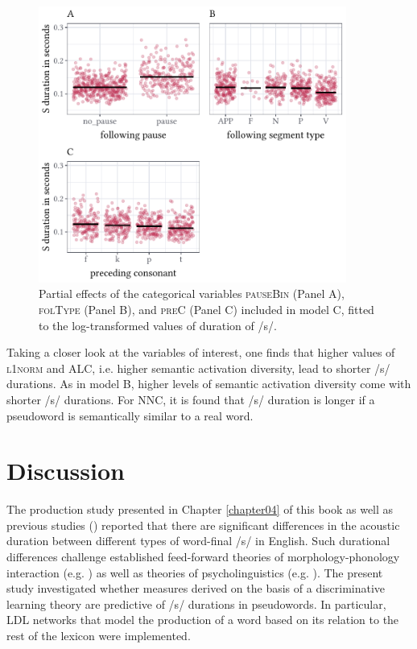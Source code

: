 \begin{figure}
    \centering
    \includegraphics[width=0.9\textwidth]{figures/fig5.4.pdf}
    \caption{Partial effects of the categorical variables \textsc{pauseBin} (Panel A), \textsc{folType} (Panel B), and \textsc{preC} (Panel C) included in model C, fitted to the log-transformed values of duration of /s/.}
    \label{fig:5_4}
\end{figure}

Taking a closer look at the variables of interest, one finds that higher values of \textsc{l1norm} and \textsc{ALC}, i.e. higher semantic activation diversity, lead to shorter /s/ durations. As in model B, higher levels of semantic activation diversity come with shorter /s/ durations. For \textsc{NNC}, it is found that /s/ duration is longer if a pseudoword is semantically similar to a real word.

\section{Discussion}\label{section05_4}

The production study presented in Chapter \ref{chapter04} of this book as well as previous studies (\cite{Zimmermann2016, Plag2017, Seyfarth2017, Tomaschek2019, Plag2020}) reported that there are significant differences in the acoustic duration between different types of word-final /s/ in English. Such durational differences challenge established feed-forward theories of morphology-phonology interaction (e.g. \cite{Chomsky1968, Kiparsky1982}) as well as theories of psycholinguistics (e.g. \cite{Levelt1999, Roelofs2019, Turk2020}). The present study investigated whether measures derived on the basis of a discriminative learning theory are predictive of /s/ durations in pseudowords. In particular, LDL networks that model the production of a word based on its relation to the rest of the lexicon were implemented.

